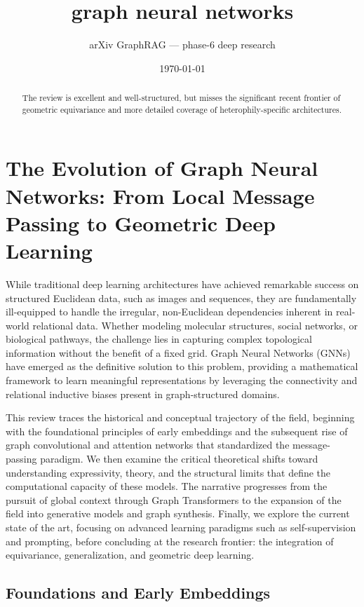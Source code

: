 \documentclass[11pt]{article}
\title{graph neural networks}
\author{arXiv GraphRAG --- phase-6 deep research}
\date{\today}
\begin{document}
\maketitle

\begin{abstract}
The review is excellent and well-structured, but misses the significant recent frontier of geometric equivariance and more detailed coverage of heterophily-specific architectures.
\end{abstract}

\section{The Evolution of Graph Neural Networks: From Local Message Passing to Geometric Deep Learning}

While traditional deep learning architectures have achieved remarkable success on structured Euclidean data, such as images and sequences, they are fundamentally ill-equipped to handle the irregular, non-Euclidean dependencies inherent in real-world relational data. Whether modeling molecular structures, social networks, or biological pathways, the challenge lies in capturing complex topological information without the benefit of a fixed grid. Graph Neural Networks (GNNs) have emerged as the definitive solution to this problem, providing a mathematical framework to learn meaningful representations by leveraging the connectivity and relational inductive biases present in graph-structured domains.

This review traces the historical and conceptual trajectory of the field, beginning with the foundational principles of early embeddings and the subsequent rise of graph convolutional and attention networks that standardized the message-passing paradigm. We then examine the critical theoretical shifts toward understanding expressivity, theory, and the structural limits that define the computational capacity of these models. The narrative progresses from the pursuit of global context through Graph Transformers to the expansion of the field into generative models and graph synthesis. Finally, we explore the current state of the art, focusing on advanced learning paradigms such as self-supervision and prompting, before concluding at the research frontier: the integration of equivariance, generalization, and geometric deep learning.

\subsection{Foundations and Early Embeddings}
\end{document}
